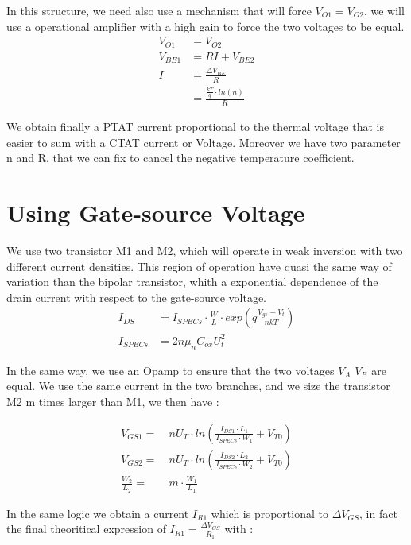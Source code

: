 \documentclass[11pt,a4paper]{report}
\begin{document}
In this structure, we need also use a mechanism that will force $V_{O1} = V_{O2}$, we will use a operational amplifier with a high gain to force the two voltages to be equal.
\begin{align}
  V_{O1} & = V_{O2} \\
  V_{BE1}& = RI + V_{BE2} \\
  I      & = \frac{\Delta V_{BE}}{R} \\
         & = \frac{\frac{kT}{q}\cdot ln(n)}{R}
\end{align}

We obtain finally a PTAT current proportional to the thermal voltage that is easier to sum with a CTAT current or Voltage. Moreover we have two parameter n and R, that we can fix to cancel the negative temperature coefficient.

\section{Using Gate-source Voltage}

We use two transistor M1 and M2, which will operate in weak inversion with two different current densities. This region of operation have quasi the same way of variation than the bipolar transistor, whith a exponential dependence of the drain current with respect to the gate-source voltage.
\begin{align}
  I_{DS} & = I_{SPECs} \cdot \frac{W}{L} \cdot exp\left( q\frac{V_{gs}-V_t}{nkT} \right) \\
  I_{SPECs} & = 2 n \mu_{n} C_{ox} U_t^2
\end{align}

\newpage

In the same way, we use an Opamp to ensure that the two voltages $V_A$ $V_B$ are equal. We use the same current in the two branches, and we size the transistor M2 m times larger than M1, we then have :

\begin{align}
  V_{GS1} = & ~ n U_T \cdot ln\left( \frac{I_{DS1} \cdot L_1}{I_{SPECs} \cdot W_1} + V_{T0} \right) \\ 
  V_{GS2} = & ~ n U_T \cdot ln\left( \frac{I_{DS2} \cdot L_2}{I_{SPECs} \cdot W_2} + V_{T0} \right) \\
  \frac{W_2}{L_2} = & ~ m \cdot \frac{W_1}{L_1}
\end{align}

In the same logic we obtain a current $I_{R1}$ which is proportional to $\Delta V_{GS}$, in fact the final theoritical expression of $I_{R1} = \frac{\Delta V_{GS}}{R_1}$ with :
\end{document}

